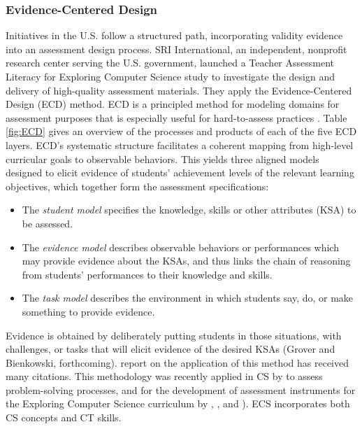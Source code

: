 %



\subsubsection{Evidence-Centered Design}\label{sec:ECD}
Initiatives in the U.S. follow a structured path, incorporating validity evidence into an assessment design process. SRI International, an independent, nonprofit research center serving the U.S. government, launched a Teacher Assessment Literacy for Exploring Computer Science study to investigate the design and delivery of high-quality assessment materials. They apply the Evidence-Centered Design (ECD) method. ECD is a principled method for modeling domains for assessment purposes that is especially useful for hard-to-assess practices \cite{grover2016assessing}. Table \ref{fig:ECD} gives an overview of the processes and products of each of the five ECD layers. ECD's systematic structure facilitates a coherent mapping from high-level curricular goals to observable behaviors. This yields three aligned models designed to elicit evidence of students' achievement levels of the relevant learning objectives, which together form the assessment specifications:
\begin{itemize}
\item The \emph{student model} specifies the knowledge, skills or other attributes (KSA) to be assessed.
\item The \emph{evidence model} describes observable behaviors or performances which may provide evidence about the KSAs, and thus links the chain of reasoning from students’ performances to their knowledge and skills.
\item The \emph{task model} describes the environment in which students say, do, or make something to provide evidence.
\end{itemize}

Evidence is obtained by deliberately putting students in those situations, with challenges, or tasks that will elicit evidence of the desired KSAs (Grover and Bienkowski, forthcoming).  report on the application of this method has received many citations. This methodology was recently applied in CS by  to assess problem-solving processes, and for the development of assessment instruments for the Exploring Computer Science curriculum by , , and ). ECS incorporates both CS concepts and CT skills.



